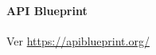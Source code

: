 \paragraph{API Blueprint}
\label{soa:tecnologias:api-blueprint}

Ver \url{https://apiblueprint.org/}
